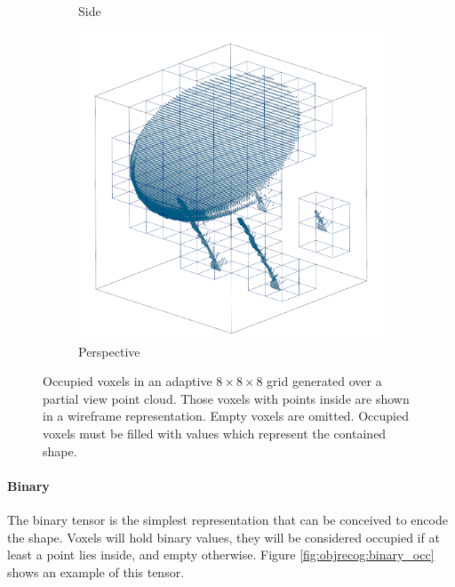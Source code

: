 \begin{figure}[!t]
\begin{subfigure}{0.325\textwidth}
		\caption{Side}
		\label{subfig:objrecog:grid_occ:side}
	\end{subfigure}
	\hfill
	\begin{subfigure}{0.325\textwidth}
		\centering
		\includegraphics[width=\linewidth]{Figures/ObjRecog/surface_grid_persp}
		\caption{Perspective}
		\label{subfig:objrecog:grid_occ:persp}
	\end{subfigure}
	\hfill
	\caption{Occupied voxels in an adaptive $8\times8\times8$ grid generated over a partial view point cloud. Those voxels with points inside are shown in a wireframe representation. Empty voxels are omitted. Occupied voxels must be filled with values which represent the contained shape.}
	\label{fig:objrecog:grid_occ}
\end{figure}

\paragraph{Binary}

The binary tensor is the simplest representation that can be conceived to encode the shape. Voxels will hold binary values, they will be considered occupied if at least a point lies inside, and empty otherwise. Figure \ref{fig:objrecog:binary_occ} shows an example of this tensor.

